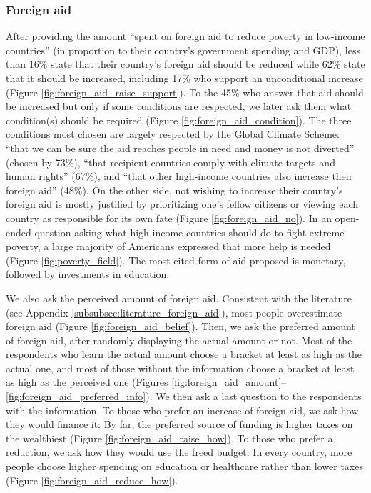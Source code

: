 \subsubsection{Foreign aid} %
After providing the amount %
``spent on foreign aid to reduce poverty in low-income countries'' (in proportion to their country's government spending and GDP), less than 16\% state that their country's foreign aid should be reduced while 62\% state that it should be increased, including 17\% who support an unconditional increase (Figure \ref{fig:foreign_aid_raise_support}). To the 45\% who answer that aid should be increased but only if some conditions are respected, we later ask them what condition(s) should be required (Figure \ref{fig:foreign_aid_condition}). The three conditions most chosen are largely respected by the Global Climate Scheme: %
``that we can be sure the aid reaches people in need and money is not diverted'' (chosen by 73\%), ``that recipient countries comply with climate targets and human rights'' (67\%), and ``that other high-income countries also increase their foreign aid'' (48\%). %
On the other side, not wishing to increase their country's foreign aid is mostly justified by prioritizing one's fellow citizens or viewing each country as responsible for its own fate (Figure \ref{fig:foreign_aid_no}). In an open-ended question asking what high-income countries should do to fight extreme poverty, a large majority of Americans expressed that more help is needed (Figure \ref{fig:poverty_field}). The most cited form of aid proposed is monetary, followed by investments in education. 

We also ask the perceived amount of foreign aid. Consistent with the literature (see Appendix \ref{subsubsec:literature_foreign_aid}), most people overestimate foreign aid (Figure \ref{fig:foreign_aid_belief}). Then, we ask the preferred amount of foreign aid, after randomly displaying the actual amount or not. Most of the respondents who learn the actual amount choose a bracket at least as high as the actual one, and most of those without the information choose a bracket at least as high as the perceived one (Figures \ref{fig:foreign_aid_amount}--\ref{fig:foreign_aid_preferred_info}). We then ask a last question to the respondents with the information. To those who prefer an increase of foreign aid, we ask how they would finance it: By far, the preferred source of funding is higher taxes on the wealthiest (Figure \ref{fig:foreign_aid_raise_how}). To those who prefer a reduction, we ask how they would use the freed budget: In every country, more people choose higher spending on education or healthcare rather than lower taxes (Figure \ref{fig:foreign_aid_reduce_how}). 

